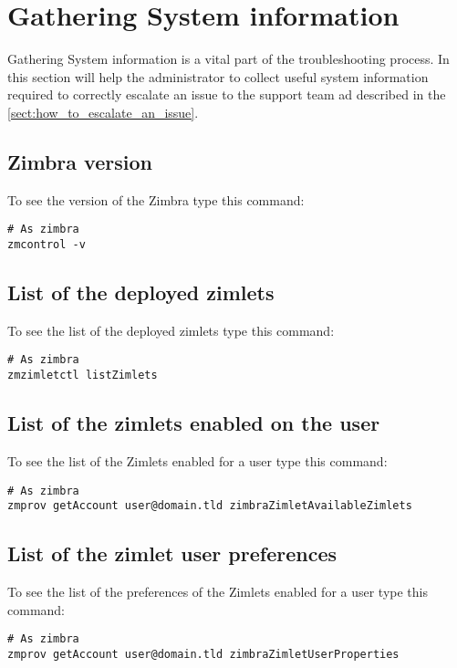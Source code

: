 \section{Gathering System information}
\label{sect:gatheringinfo}

Gathering System information is a vital part of the troubleshooting process. In this section will help the administrator
to collect useful system information required to correctly escalate an issue to the support team ad described in the
\autoref{sect:how_to_escalate_an_issue}.

    \subsection{Zimbra version}
    \label{sect:gatheringinfo-zversion}
        To see the version of the Zimbra type this command:
        \begin{verbatim}
# As zimbra
zmcontrol -v
        \end{verbatim}

    \subsection{List of the deployed zimlets}
    \label{sect:gatheringinfo-listzimlets}
        To see the list of the deployed zimlets type this command:
        \begin{verbatim}
# As zimbra
zmzimletctl listZimlets
        \end{verbatim}

    \subsection{List of the zimlets enabled on the user}
    \label{sect:gatheringinfo-userzimlets}
        To see the list of the Zimlets enabled for a user type this command:
        \begin{verbatim}
# As zimbra
zmprov getAccount user@domain.tld zimbraZimletAvailableZimlets
        \end{verbatim}

    \subsection{List of the zimlet user preferences}
    \label{sect:gatheringinfo-userzimlets-pref}
        To see the list of the preferences of the Zimlets enabled for a user type this command:
        \begin{verbatim}
# As zimbra
zmprov getAccount user@domain.tld zimbraZimletUserProperties
        \end{verbatim}

